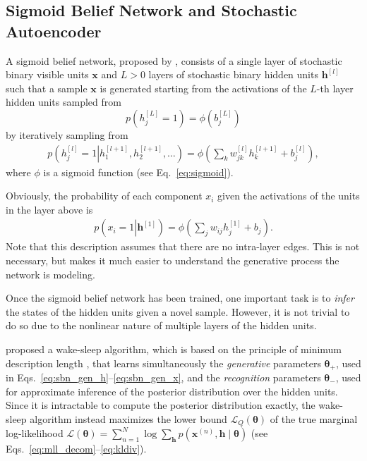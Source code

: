 \documentclass[dissertation,nocontribution,draft*]{aaltoseries}
\newcommand{\qlay}[1]{\left[#1\right]}
\newcommand{\vect}[1]{\mathbf{#1}}
\newcommand{\vects}[1]{\boldsymbol{#1}}
\newcommand{\vh}[0]{\vect{h}}
\newcommand{\vx}[0]{\vect{x}}
\newcommand{\TT}[0]{{\vects{\theta}}}
\newcommand{\LL}[0]{\mathcal{L}}
\begin{document}
\subsection{Sigmoid Belief Network and Stochastic Autoencoder}
\label{sec:sbn_dbn}

A sigmoid belief network, proposed by \citet{Neal1992},
consists of a single layer of stochastic binary visible
units $\vx$ and $L > 0$ layers of stochastic binary
hidden units $\vh^{\qlay{l}}$ such that a sample $\vx$ is
generated starting from the activations of the $L$-th layer
hidden units sampled from
\[
p\left(h_j^{\qlay{L}} = 1\right) = \phi\left( b_j^{\qlay{L}}
\right)
\]
by iteratively sampling from 
\begin{align}
    \label{eq:sbn_gen_h}
    p\left(h_j^{\qlay{l}} = 1 \left| h_1^{\qlay{l+1}},
    h_2^{\qlay{l+1}}, \dots
    \right.\right) = \phi\left( \sum_{k} w_{jk}^{\qlay{l}}
    h_k^{\qlay{l+1}} + b_j^{\qlay{l}}\right),
\end{align}
where $\phi$ is a sigmoid function (see
Eq.~\eqref{eq:sigmoid}). 

Obviously, the probability of each component $x_i$ given the
activations of the units in the layer above is
\begin{align}
    \label{eq:sbn_gen_x}
    p\left(x_i = 1 \left| \vh^{\qlay{1}}
    \right.\right) = \phi\left( \sum_{j} w_{ij}
    h_j^{\qlay{1}} + b_j\right).
\end{align}
Note that this description assumes that there are no
intra-layer edges. This is not necessary, but makes it much
easier to understand the generative process the network is
modeling.

Once the sigmoid belief network has been trained, one 
important task is to \textit{infer} the states of the hidden
units given a novel sample. However, it is not trivial to do
so due to the nonlinear nature of multiple layers of the
hidden units.

\citet{Hinton1995} proposed a wake-sleep algorithm, which is
based on the principle of minimum description length
\citep{Rissanen1978},
that learns simultaneously the \textit{generative}
parameters $\TT_+$, used in
Eqs.~\eqref{eq:sbn_gen_h}--\eqref{eq:sbn_gen_x}, and the
\textit{recognition} parameters $\TT_-$, used for
approximate inference of the posterior distribution over the
hidden units. Since it is intractable to compute the
posterior distribution exactly, the wake-sleep algorithm
instead maximizes the lower bound $\LL_Q(\TT)$ of the true
marginal log-likelihood $\LL(\TT) = \sum_{n=1}^N \log
\sum_{\vh} p(\vx^{(n)}, \vh \mid \TT)$ (see
Eqs.~\eqref{eq:mll_decom}--\eqref{eq:kldiv}).
\end{document}
